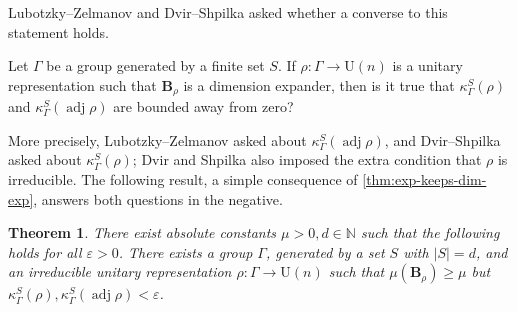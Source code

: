 \documentclass[11pt]{article}
\newtheorem{theorem}{Theorem}[section]
\newcommand{\N}{{\mathbb N}}
\theoremstyle{plain}
\numberwithin{equation}{section}
\theoremstyle{definition}
\DeclareMathOperator\adj{adj}
\newcommand{\ab}[1]{\left\lvert#1\right\rvert}
\newcommand{\U}{\mathrm{U}}
\newcommand{\tuple}[1]{\mathbf{#1}}
\newcommand{\vB}{\tuple{B}}
\begin{document}
Lubotzky--Zelmanov \cite[Remark/Question 2.5]{LUBOTZKY2008730} and Dvir--Shpilka \cite[Question 1]{DS09} asked whether a converse to this statement holds. 
\begin{closedquestion}
    Let $\Gamma$ be a group generated by a finite set $S$. If $\rho:\Gamma \to \U(n)$ is a unitary representation such that $\vB_\rho$ is a dimension expander, then is it true that $\kappa_\Gamma^S(\rho)$ and $\kappa_\Gamma^S(\adj \rho)$ are bounded away from zero? 
\end{closedquestion}
More precisely, Lubotzky--Zelmanov asked about $\kappa_\Gamma^S(\adj \rho)$, and Dvir--Shpilka asked about $\kappa_\Gamma^S(\rho)$; Dvir and Shpilka also imposed the extra condition that $\rho$ is irreducible. The following result, a simple consequence of \cref{thm:exp-keeps-dim-exp}, answers both questions in the negative.
\begin{theorem}\label{thm:no property T}
    There exist absolute constants $\mu>0, d \in \N$ such that the following holds for all $\varepsilon>0$. There exists a group $\Gamma$, generated by a set $S$ with $\ab S=d$, and an irreducible unitary representation $\rho:\Gamma \to \U(n)$ such that $\mu(\vB_\rho) \geq \mu$ but $\kappa_\Gamma^S(\rho), \kappa_\Gamma^S(\adj \rho) < \varepsilon$.
\end{theorem}
\end{document}
